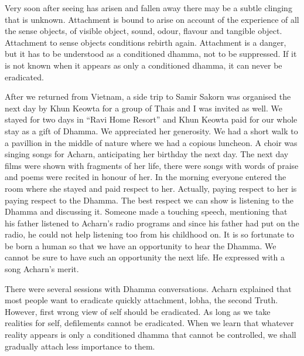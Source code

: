 Very soon after seeing has arisen and fallen away there may be a subtle
clinging that is unknown. Attachment is bound to arise on account of the
experience of all the sense objects, of visible object, sound, odour,
flavour and tangible object. Attachment to sense objects conditions
rebirth again. Attachment is a danger, but it has to be understood as a
conditioned dhamma, not to be suppressed. If it is not known when it
appears as only a conditioned dhamma, it can never be eradicated.

After we returned from Vietnam, a side trip to Samir Sakorn was
organised the next day by Khun Keowta for a group of Thais and I was
invited as well. We stayed for two days in ``Ravi Home Resort'' and Khun
Keowta paid for our whole stay as a gift of Dhamma. We appreciated her
generosity. We had a short walk to a pavillion in the middle of nature
where we had a copious luncheon. A choir was singing songs for Acharn,
anticipating her birthday the next day. The next day films were shown
with fragments of her life, there were songs with words of praise and
poems were recited in honour of her. In the morning everyone entered the
room where she stayed and paid respect to her. Actually, paying respect
to her is paying respect to the Dhamma. The best respect we can show is
listening to the Dhamma and discussing it. Someone made a touching
speech, mentioning that his father listened to Acharn's radio programs
and since his father had put on the radio, he could not help listening
too from his childhood on. It is so fortunate to be born a human so that
we have an opportunity to hear the Dhamma. We cannot be sure to have
such an opportunity the next life. He expressed with a song Acharn's
merit.

There were several sessions with Dhamma conversations. Acharn explained
that most people want to eradicate quickly attachment, lobha, the second
Truth. However, first wrong view of self should be eradicated. As long
as we take realities for self, defilements cannot be eradicated. When we
learn that whatever reality appears is only a conditioned dhamma that
cannot be controlled, we shall gradually attach less importance to them.

